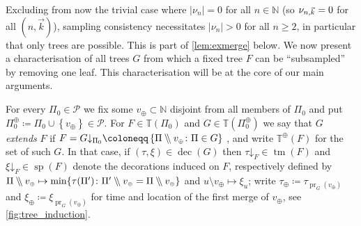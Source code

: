 \documentclass[reqno,draft]{amsart}
\numberwithin{equation}{section}
\theoremstyle{plain}
\theoremstyle{remark}
\newcommand{\N}{\mathbb{N}} %
\DeclareMathOperator{\pr}{pr}
\newcommand{\fpart}{\Pi} %
\DeclareMathOperator{\dcb}{dec}
\DeclareMathOperator{\dct}{tm}
\DeclareMathOperator{\dcs}{sp}
\newcommand{\kbr}{K} %
\newcommand{\wo}{\mathbin{{\setminus}\mspace{-5mu}{\setminus}}}
\newcommand{\la}{\beta} %
\newcommand{\nut}[1]{|\nu_{#1}|}
\newcommand{\nunk}{\nu_{n,\smash{\vec{k}}}}
\newcommand{\rsto}[1]{\mathord\downarrow_{#1}}
\begin{document}
Excluding from now the trivial case where $\nut{n} = 0$ for all $n \in \N$ (so $\nunk = 0$ for all $(n,\vec{k})$), sampling consistency necessitates $\nut{n} > 0$ for all $n \ge 2$, in particular that only trees are possible. This is part of \cref{lem:exmerge} below. We now present a characterisation of all trees $G$ from which a fixed tree $F$ can be ``subsampled'' by removing one leaf. This characterisation will be at the core of our main arguments.


\def\new{^{\scriptscriptstyle\oplus}}
\def\vnew{v_{\scriptscriptstyle\oplus}} %
\def\unew{u_{\scriptscriptstyle\oplus}} %
\def\newsub{_{\scaleto{\oplus}{3.5pt}}} %
\def\wnew{w_{\scriptscriptstyle\oplus}} %
\def\tnew{\tau_{\scriptscriptstyle\oplus}} %
\def\xinew{\xi_{\scriptscriptstyle\oplus}}
\def\Fnew{G} %
\def\Pnew{\fpart\new_{\Fnew}} %
\def\Pnewrs{\fpart\new_{F}} %
\def\TTm{\mathbb{T}\new_\textrm{m}(F)} %
\def\TTb{\mathbb{T}\new_\textrm{b}(F)} %
\def\TTbs{\mathbb{T}\new_\textrm{sb}(F)} %
\def\lanew{\la\new_{\Fnew}}
\newcommand{\kbrp}[1]{\kbr^{\textrm{#1}\scriptscriptstyle\oplus}}

For every $\fpart_0 \in \mathcal{P}$ we fix some $\vnew \subset \N$ disjoint from all members of $\fpart_0$ and put $\fpart_0\new \coloneqq \fpart_0 \cup \left\{ \vnew \right\} \in \mathcal{P}$. For $F\in \mathbb{T}(\fpart_0)$ and $\Fnew\in \mathbb{T}(\fpart_0\new)$ we say that $\Fnew$ \emph{extends} $F$ if $F = \Fnew\rsto{\fpart_0} \coloneqq \left\{ \fpart\wo \vnew\colon \fpart\in \Fnew \right\} $ %
, and write $\mathbb{T}\new(F)$ for the set of such $\Fnew$. In that case, if $(\tau,\xi) \in \dcb(\Fnew)$ then $\tau\rsto{F} \in \dct(F)$ and $\xi\rsto{F} \in \dcs(F)$ denote the decorations induced on $F$, respectively defined by $\fpart \wo \vnew \mapsto \min\{\tau(\fpart')\colon \fpart'\wo\vnew = \fpart\wo\vnew\}$ and $u \setminus \vnew \mapsto \xi_u$; write $\tnew \coloneqq \tau_{\pr_\Fnew(\vnew)}$ and $\xinew\coloneqq \xi_{\pr_{\Fnew}(\vnew)}$ for time and location of the first merge of $\vnew$, see \cref{fig:tree_induction}.
\end{document}
